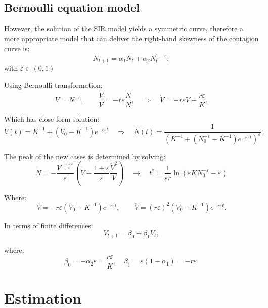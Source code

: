 \documentclass[12pt]{article}
\begin{document}
    \subsection{Bernoulli equation model}

    However, the solution of the SIR model yields a symmetric curve, therefore a more appropriate model that can deliver the right-hand skewness of the contagion curve is:
    \begin{equation}
        N_{t+1} = \alpha_1 N_t + \alpha_2 N_{t}^{1 + \varepsilon},
        \label{eq:equation0}
    \end{equation}
    with $\varepsilon \in (0,1)$

    Using Bernoulli transformation:
    $$V = N^{-\varepsilon}, \qquad \frac{\dot V}{V} = -r \varepsilon \frac{\dot N}{N}, \quad \Rightarrow \quad \dot V = -r\varepsilon V + \frac{r\varepsilon}{K}. $$

    Which has close form solution:
    $$ V(t) = K^{-1} + \left(V_0-K^{-1}\right)e^{-r\varepsilon t} \quad \Rightarrow \quad N(t)=\frac{1}{\left(K^{-1} + \left(N_0^{-\varepsilon}-K^{-1}\right)e^{-r\varepsilon t}\right)^\varepsilon}\,.$$

    The peak of the new cases is determined by solving:
    $$ \ddot N = -\frac{V^{-\frac{1+\varepsilon}{\varepsilon}}}{\varepsilon} \left(\ddot V -\frac{1+\varepsilon}{\varepsilon} \frac{\dot V ^2}{V}\right) \quad \to \quad t^* = \frac{1}{\varepsilon r}\ln \left(\varepsilon K N_0^{-\varepsilon}-\varepsilon\right) $$

    Where:
    $$ \dot V = -r\varepsilon\left(V_0-K^{-1}\right)e^{-r\varepsilon t}, \qquad \ddot V = (r\varepsilon)^2 \left(V_0-K^{-1}\right)e^{-r\varepsilon t}. $$

    In terms of finite differences:
    $$ V_{t+1} = \beta_0 + \beta_1 V_t,$$

    where:
    $$\beta_0 = -\alpha_2\varepsilon = \frac{r \varepsilon}{K}, \quad \beta_1=\varepsilon(1-\alpha_1) = - r\varepsilon.$$

    \newpage

    \section{Estimation}\label{sec:estimation}
    
\end{document}
